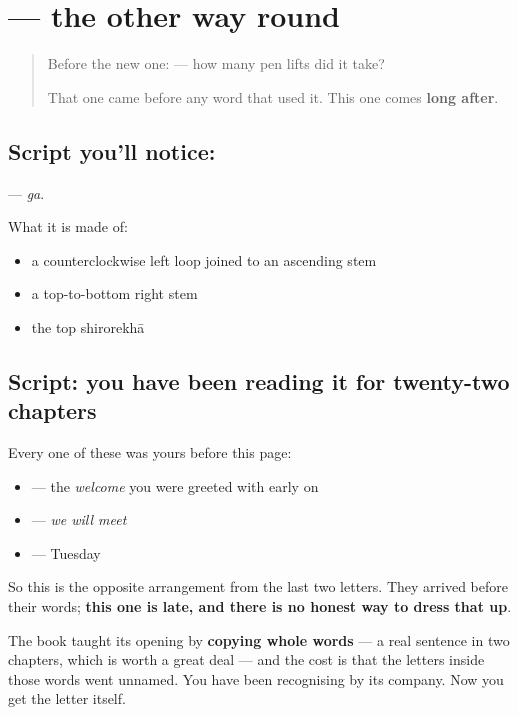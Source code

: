 \section[\texorpdfstring{\hi{ग} (ga)}{ग (ga)}]{ — the other way round}

\label{lesson:HI-S138-letter-ga}



\begin{quote}
Before the new one: \textbf{} — how many pen lifts did it take?

That one came before any word that used it. This one comes \textbf{long after}.
\end{quote}

\subsection*{Script you'll notice: }
\textbf{} — \emph{ga}.

What it is made of:

\begin{itemize}
\raggedright
  \item a counterclockwise left loop joined to an ascending stem
  \item a top-to-bottom right stem
  \item the top shirorekhā
\end{itemize}

\subsection*{Script: you have been reading it for twenty-two chapters}
Every one of these was yours before this page:

\begin{itemize}
\raggedright
  \item \textbf{} — the \emph{welcome} you were greeted with early on
  \item \textbf{} — \emph{we will meet}
  \item \textbf{} — Tuesday
\end{itemize}

So this is the opposite arrangement from the last two letters. They arrived before their words; \textbf{this one is late, and there is no honest way to dress that up}.

The book taught its opening by \textbf{copying whole words} — a real sentence in two chapters, which is worth a great deal — and the cost is that the letters inside those words went unnamed. You have been recognising \textbf{} by its company. Now you get the letter itself.

